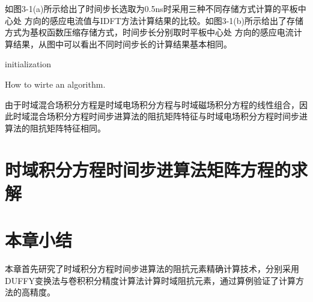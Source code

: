 \documentclass{standalone}
\begin{document}
如图3-1(a)所示给出了时间步长选取为0.5ns时采用三种不同存储方式计算的平板中心处 方向的感应电流值与IDFT方法计算结果的比较。如图3-1(b)所示给出了存储方式为基权函数压缩存储方式，时间步长分别取时平板中心处 方向的感应电流计算结果，从图中可以看出不同时间步长的计算结果基本相同。

\begin{algorithm}[H]
	initialization\;
\caption{How to wirte an algorithm.}
\end{algorithm}

由于时域混合场积分方程是时域电场积分方程与时域磁场积分方程的线性组合，因此时域混合场积分方程时间步进算法的阻抗矩阵特征与时域电场积分方程时间步进算法的阻抗矩阵特征相同。

\section{时域积分方程时间步进算法矩阵方程的求解}

\section{本章小结}
本章首先研究了时域积分方程时间步进算法的阻抗元素精确计算技术，分别采用DUFFY变换法与卷积积分精度计算法计算时域阻抗元素，通过算例验证了计算方法的高精度。
\end{document}
